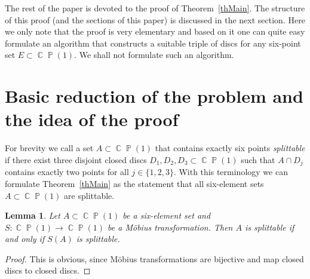\documentclass{amsart}
\numberwithin{equation}{section}
\newtheorem{lemma}[theorem]{Lemma}
\theoremstyle{definition}
\theoremstyle{remark}
\DeclareMathOperator{\CC}{\mathbb C}
\DeclareMathOperator{\PP}{\mathbb P}
\begin{document}
	The rest of the paper is devoted to the proof of Theorem~\ref{thMain}. The structure of this proof (and the sections of this paper) is discussed in the next section. Here we only note that the proof is very elementary and based on it one can quite easy formulate an algorithm that constructs a suitable triple of discs for any six-point set $E \subset \CC\PP(1)$. We shall not formulate such an algorithm.
	
	\section{Basic reduction of the problem and the idea of the proof}
	
	For brevity we call a set $A \subset \CC\PP(1)$ that contains exactly six points {\it{splittable}} if there exist three disjoint closed discs $D_1,D_2,D_3 \subset \CC\PP(1)$ such that $A \cap D_j$ contains exactly two points for all $j \in \{1,2,3\}$. With this terminology we can formulate Theorem~\ref{thMain} as the statement that all six-element sets $A \subset \CC\PP(1)$ are splittable.
	
	\begin{lemma}\label{lemProjectiveInvarianceSplittable}
		Let $A \subset \CC\PP(1)$ be a six-element set and $S:\CC\PP(1) \to \CC\PP(1)$ be a M\"obius transformation. Then $A$ is splittable if and only if $S(A)$ is splittable.
	\end{lemma}
	\begin{proof}
		This is obvious, since M\"obius transformations are bijective and map closed discs to closed discs.
	\end{proof}
	
\end{document}
